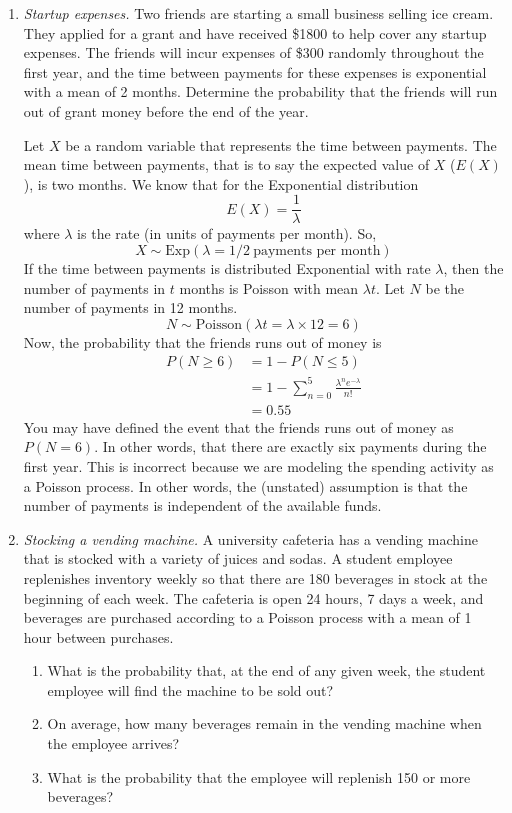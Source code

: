 \begin{enumerate}
\item \emph{Startup expenses.}  Two friends are starting a small
  business selling ice cream. They applied for a grant and have
  received \$\num{1800} to help cover any startup expenses. The
  friends will incur expenses of \$300 randomly throughout the first
  year, and the time between payments for these expenses is
  exponential with a mean of 2 months. Determine the probability that
  the friends will run out of grant money before the end of the year.

\begin{solution}
  \bs Let $X$ be a random variable that represents the time between
  payments. The mean time between payments, that is to say the
  expected value of $X$ ($E(X)$), is two months. We know that for the
  Exponential distribution
  \[ E(X) = \frac{1}{\lambda} \] where $\lambda$ is the rate (in units
  of payments per month). So,
  \[ X \sim \text{Exp}(\lambda = 1/2~\text{payments per month}) \] If
  the time between payments is distributed Exponential with rate
  $\lambda$, then the number of payments in $t$ months is Poisson with
  mean $\lambda t$. Let $N$ be the number of payments in 12 months.
  \[ N \sim \text{Poisson}(\lambda t = \lambda \times 12 = 6) \] Now,
  the probability that the friends runs out of money is
\begin{align*}
      P(N \geq 6) &= 1 - P(N \leq 5) \\
      &= 1 - \sum_{n=0}^{5} \frac{\lambda^n e^{-\lambda}}{n!}\\
      &= 0.55
\end{align*}
You may have defined the event that the friends runs out of
money as $P(N = 6)$. In other words, that there are exactly
six payments during the first year.  This is incorrect because
we are modeling the spending activity as a Poisson process. In
other words, the (unstated) assumption is that the number of
payments is independent of the available funds.
\end{solution}

\item \emph{Stocking a vending machine.}  A university cafeteria has a
  vending machine that is stocked with a variety of juices and
  sodas. A student employee replenishes inventory weekly so that there
  are 180 beverages in stock at the beginning of each week. The
  cafeteria is open 24 hours, 7 days a week, and beverages are
  purchased according to a Poisson process with a mean of 1 hour
  between purchases.
\begin{enumerate}
\item What is the probability that, at the end of any given week, the
  student employee will find the machine to be sold out? \label{ex:pout}
\item On average, how many beverages remain in the vending
  machine when the employee arrives? \label{ex:qremain}
\item What is the probability that the employee will replenish 150 or
  more beverages? \label{ex:preplenish}
\end{enumerate}


\end{enumerate}
